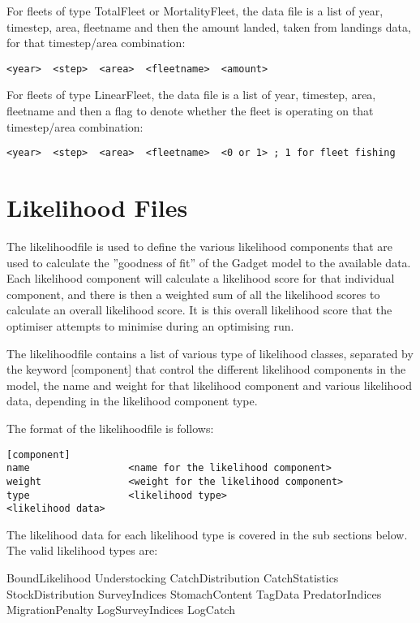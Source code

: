 \documentclass [a4paper, 10pt]{book}
\begin{document}
For fleets of type TotalFleet or MortalityFleet, the data file is a list of year, timestep, area, fleetname and then the amount landed, taken from landings data, for that timestep/area combination:

\begin{verbatim}
<year>  <step>  <area>  <fleetname>  <amount>
\end{verbatim}

For fleets of type LinearFleet, the data file is a list of year, timestep, area, fleetname and then a flag to denote whether the fleet is operating on that timestep/area combination:

\begin{verbatim}
<year>  <step>  <area>  <fleetname>  <0 or 1> ; 1 for fleet fishing
\end{verbatim}

\chapter{Likelihood Files}\label{chap:like}
The likelihoodfile is used to define the various likelihood components that are used to calculate the ''goodness of fit'' of the Gadget model to the available data.  Each likelihood component will calculate a likelihood score for that individual component, and there is then a weighted sum of all the likelihood scores to calculate an overall likelihood score.  It is this overall likelihood score that the optimiser attempts to minimise during an optimising run.

\bigskip
The likelihoodfile contains a list of various type of likelihood classes, separated by the keyword [component] that control the different likelihood components in the model, the name and weight for that likelihood component and various likelihood data, depending in the likelihood component type.

\bigskip
The format of the likelihoodfile is follows:

\begin{verbatim}
[component]
name                 <name for the likelihood component>
weight               <weight for the likelihood component>
type                 <likelihood type>
<likelihood data>
\end{verbatim}

The likelihood data for each likelihood type is covered in the sub sections below.  The valid likelihood types are:\newline

BoundLikelihood\newline
Understocking\newline
CatchDistribution\newline
CatchStatistics\newline
StockDistribution\newline
SurveyIndices\newline
StomachContent\newline
TagData\newline
PredatorIndices\newline
MigrationPenalty\newline
LogSurveyIndices\newline
LogCatch
\end{document}
